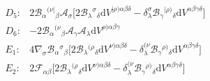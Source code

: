 \documentclass{article}
\providecommand{\B}[3]{\mathcal{B}_{#1}{}^{ #2}{}_{#3}}
\providecommand{\A}[1]{\mathcal{A}_{#1}}
\providecommand{\deV}[1]{\mathrm{d}V^{#1}}
\begin{document}
\begin{align*}
    D_5: & 2 \B{\alpha}{(\nu\vert}{\beta} \A{\sigma} \Big[ 2 \B{\lambda}{\sigma}{\delta} \deV{\vert\rho)\alpha\beta\delta} - \delta^\sigma_\lambda \B{\gamma}{\vert\rho)}{\delta} \deV{\alpha\beta\gamma\delta} \Big] \\
    D_6: & -2 \B{\alpha}{(\nu}{\beta} \A{\gamma} \A{\lambda} \deV{\rho)\alpha\beta\gamma} \\
    E_1: & 4 \nabla_\sigma \B{\alpha}{\sigma}{\beta} \Big[ 2 \B{\lambda}{(\rho}{\delta} \deV{\nu)\alpha\beta\delta} - \delta^{(\nu}_\lambda \B{\gamma}{\rho)}{\delta} \deV{\alpha\beta\gamma\delta} \Big] \\
    E_2: & 2 \mathcal{F}_{\alpha\beta} \Big[ 2 \B{\lambda}{(\rho}{\delta} \deV{\nu)\alpha\beta\delta} - \delta^{(\nu}_\lambda \B{\gamma}{\rho)}{\delta} \deV{\alpha\beta\gamma\delta} \Big] 
\end{align*}



\end{document}
